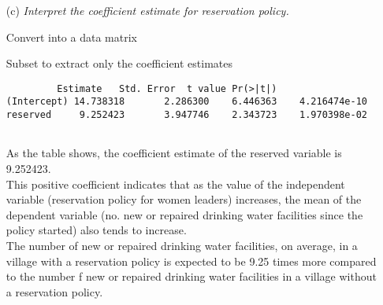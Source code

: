 \documentclass[12pt,letterpaper]{article}
\begin{document}
\begin{enumerate}
		\vspace{.5cm}
		\item [(c)] \emph{Interpret the coefficient estimate for reservation policy. }
		
		\noindent Convert into a data matrix
		
		
	
		
		\noindent Subset to extract only the coefficient estimates 
		
		
		
\begin{Verbatim}
	     Estimate	Std. Error	t value	Pr(>|t|)
(Intercept) 14.738318   	2.286300 	6.446363	4.216474e-10
reserved     9.252423   	3.947746 	2.343723	1.970398e-02
			
		\end{Verbatim}
		
		\noindent As the table shows, the coefficient estimate of the reserved variable is 9.252423. \\
		This positive coefficient indicates that as the value of the independent 
		variable (reservation policy for women leaders) increases, the mean of the 
		dependent variable (no. new or repaired drinking water facilities since the policy started) also tends to increase. \\
		
		The number of new or repaired drinking water facilities, on average, in a 
		village with a reservation policy is expected to be 9.25 times more
		compared to the number f new or repaired drinking water facilities in a 
		village without a reservation policy.
		
		
	\end{enumerate}
	
\end{document}
